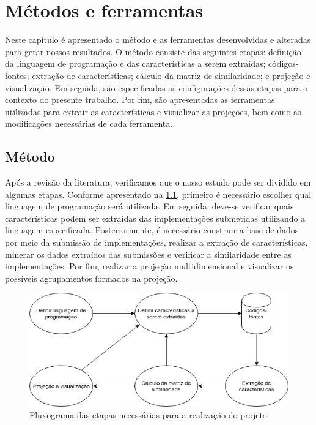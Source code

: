 \chapter{Métodos e ferramentas}
\label{chap:metodos-ferramentas}

	Neste capítulo é apresentado o método e as ferramentas desenvolvidas e alteradas para
	gerar nossos resultados. O método consiste das seguintes etapas:
	definição da linguagem de programação e das características a serem extraídas;
	códigos-fontes; extração de características; cálculo da matriz de similaridade;
	e projeção e visualização. Em seguida, são especificadas as configurações dessas etapas
	para o contexto do presente trabalho. Por fim, são apresentadas as ferramentas utilizadas para
	extrair as características e visualizar as projeções, bem como as modificações
	necessárias de cada ferramenta.

 	\section{Método}
 	
	 	Após a revisão da literatura, verificamos que o nosso estudo pode ser dividido
	 	em algumas etapas. Conforme apresentado na \cref{fig:fluxogramaProposta}, primeiro é necessário
	 	escolher qual linguagem de programação será utilizada. Em seguida, deve-se verificar
	 	quais características podem ser extraídas das implementações submetidas utilizando a
	 	linguagem especificada. Posteriormente, é necessário construir a base de dados por
	 	meio da submissão de implementações, realizar a extração de características, minerar
	 	os dados extraídos das submissões e verificar a similaridade entre as implementações.
	 	Por fim, realizar a projeção multidimensional e visualizar os possíveis agrupamentos
	 	formados na projeção.
	 	
	 	\begin{figure}[ht]
	 		\centering
	 		\includegraphics[width=0.75\linewidth]{imagem/fluxogramaProposta}
	 		\caption{Fluxograma das etapas necessárias para a realização do projeto.}
	 		\label{fig:fluxogramaProposta}
	 	\end{figure}
	 	
